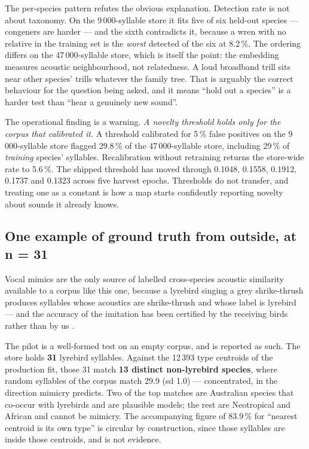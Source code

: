 \documentclass[10pt,twocolumn,a4paper]{article}
\begin{document}
The per-species pattern refutes the obvious explanation. Detection rate is not about taxonomy.
On the 9\,000-syllable store it fits five of six held-out species --- congeners are harder ---
and the sixth contradicts it, because a wren with no relative in the training set is the
\emph{worst} detected of the six at 8.2\,\%. The ordering differs on the 47\,000-syllable store,
which is itself the point: the embedding measures acoustic neighbourhood, not relatedness. A
loud broadband trill sits near other species' trills whatever the family tree. That is
arguably the correct behaviour for the question being asked, and it means ``hold out a
species'' is a harder test than ``hear a genuinely new sound''.

The operational finding is a warning. \emph{A novelty threshold holds only for the corpus that
calibrated it.} A threshold calibrated for 5\,\% false positives on the 9\,000-syllable store
flagged 29.8\,\% of the 47\,000-syllable store, including 29\,\% of \emph{training} species'
syllables. Recalibration without retraining returns the store-wide rate to 5.6\,\%. The
shipped threshold has moved through 0.1048, 0.1558, 0.1912, 0.1737 and 0.1323 across five
harvest epochs. Thresholds do not transfer, and treating one as a constant is how a map starts
confidently reporting novelty about sounds it already knows.

\subsection{One example of ground truth from outside, at n = 31}

Vocal mimics are the only source of labelled cross-species acoustic similarity available to a
corpus like this one, because a lyrebird singing a grey shrike-thrush produces syllables whose
acoustics are shrike-thrush and whose label is lyrebird --- and the accuracy of the imitation
has been certified by the receiving birds rather than by us \citep{dalziell2012}.

The pilot is a well-formed test on an empty corpus, and is reported as such. The store holds
\textbf{31} lyrebird syllables. Against the 12\,393 type centroids of the production fit,
those 31 match \textbf{13 distinct non-lyrebird species}, where random syllables of the corpus
match 29.9 (sd 1.0) --- concentrated, in the direction mimicry predicts. Two of the top
matches are Australian species that co-occur with lyrebirds and are plausible models; the rest
are Neotropical and African and cannot be mimicry. The accompanying figure of 83.9\,\% for
``nearest centroid is its own type'' is circular by construction, since those syllables are
inside those centroids, and is not evidence.
\end{document}
